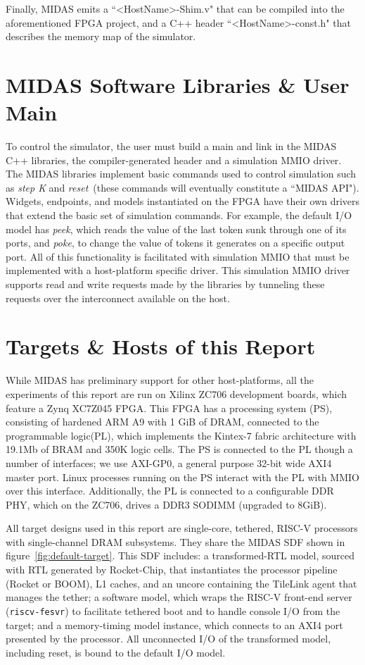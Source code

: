 Finally, MIDAS emits a ``<HostName>-Shim.v" that can be compiled into the aforementioned
FPGA project, and a C++ header ``<HostName>-const.h" that describes the memory map of the simulator.

\section{MIDAS Software Libraries \& User Main}

To control the simulator, the user must build a main and link in the MIDAS C++
libraries, the compiler-generated header and a simulation MMIO driver.  The
MIDAS libraries implement basic commands used to control simulation such as
\emph{step K} and \emph{reset}~(these commands will eventually constitute a
``MIDAS API"). Widgets, endpoints, and models instantiated on the FPGA have
their own drivers that extend the basic set of simulation commands. For
example, the default I/O model has \emph{peek}, which reads the value of the
last token sunk through one of its ports, and \emph{poke}, to change the value
of tokens it generates on a specific output port.  All of this functionality is
facilitated with simulation MMIO that must be implemented with a host-platform
specific driver. This simulation MMIO driver supports read and write requests
made by the libraries by tunneling these requests over the interconnect available
on the host.

\section{Targets \& Hosts of this Report}\label{sec:targetandhostmachines}

While MIDAS has preliminary support for other host-platforms, all the
experiments of this report are run on Xilinx ZC706 development boards, which
feature a Zynq XC7Z045 FPGA. This FPGA has a processing system (PS),
consisting of hardened ARM A9 with 1 GiB of DRAM, connected to the
programmable logic(PL), which implements the Kintex-7 fabric architecture with
19.1Mb of BRAM and 350K logic cells. The PS is connected to the PL though a
number of interfaces; we use AXI-GP0, a general purpose 32-bit wide AXI4 master port.
Linux processes running on the PS interact with the PL with MMIO over this
interface. Additionally, the PL is connected to a configurable DDR PHY, which on the
ZC706, drives a DDR3 SODIMM (upgraded to 8GiB).

All target designs used in this report are single-core, tethered, RISC-V
processors with single-channel DRAM subsystems.  They share the MIDAS SDF
shown in figure~\ref{fig:default-target}. This SDF includes: a transformed-RTL
model, sourced with RTL generated by Rocket-Chip, that instantiates the
processor pipeline (Rocket or BOOM), L1 caches, and an uncore containing the
TileLink agent that manages the tether; a software model, which wraps the
RISC-V front-end server (\texttt{riscv-fesvr}) to facilitate tethered boot
and to handle console I/O from the target; and a memory-timing
model instance, which connects to an AXI4 port presented by the processor.
All unconnected I/O of the transformed model, including reset, is bound to the
default I/O model.

